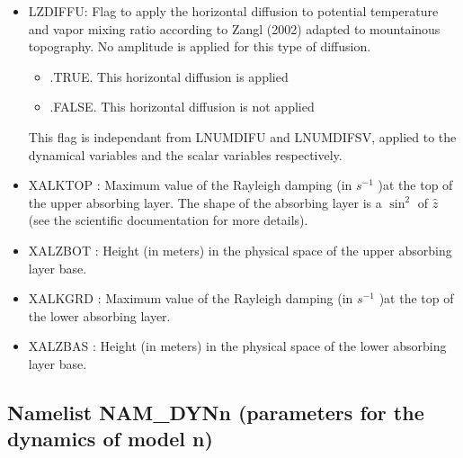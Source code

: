 \begin{itemize}
\item
{}
LZDIFFU: Flag to apply the horizontal diffusion to potential temperature and vapor mixing ratio according to Zangl (2002)
adapted to mountainous topography. No amplitude is applied for this type of diffusion.
\begin{itemize}
\item   .TRUE. This horizontal diffusion is applied 
\item   .FALSE. This horizontal diffusion is not applied           
\end{itemize}
This flag is independant from LNUMDIFU and LNUMDIFSV, applied to the dynamical variables and the scalar variables respectively.
\item
XALKTOP : Maximum value of the Rayleigh damping (in  $s^{-1}$ )at the top of the upper absorbing 
layer. The shape of the absorbing layer is a $\sin ^2$ of $\hat{z}$ (see the
scientific documentation for more details).

\item
XALZBOT :  Height (in meters) in the physical space of the upper absorbing layer base. 

\item
XALKGRD : Maximum value of the Rayleigh damping (in  $s^{-1}$ )at the top of the lower absorbing 
layer. 

\item
XALZBAS :  Height (in meters) in the physical space of the lower absorbing layer base. 

\end{itemize}
\subsection{Namelist NAM\_DYNn (parameters for the dynamics of model n)}

